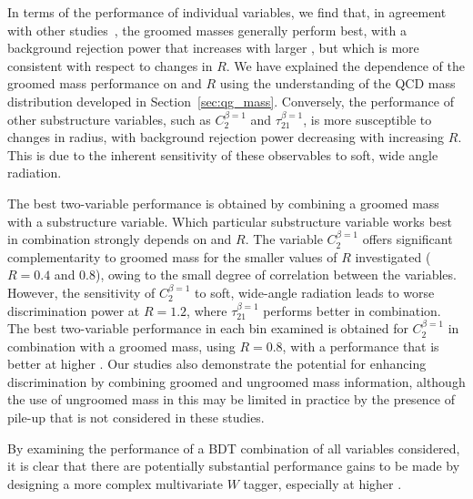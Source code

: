 In terms of the performance of individual variables, we find that, in
agreement with other studies~\cite{ATL-PHYS-PUB-2014-004}, the groomed masses generally perform best, 
with a background rejection
power that increases with larger \pt, but which is more consistent
with respect to changes in $R$. We have explained the dependence of the
groomed mass performance on \pt and $R$ using the understanding of the QCD mass distribution
developed in Section~\ref{sec:qg_mass}. Conversely, the performance of other
substructure variables, such as $C_2^{\beta=1}$ and
$\tau_{21}^{\beta=1}$, is more susceptible to changes in radius, with
background rejection power decreasing with increasing $R$. This is due
to the inherent sensitivity of these observables to soft, wide angle radiation.

The best two-variable performance is obtained by combining a groomed
mass with a substructure variable. Which particular substructure
variable works best in combination strongly depends on \pT and
$R$. The variable $C_2^{\beta=1}$ offers significant complementarity to groomed mass
for the smaller values of $R$ investigated ($R=0.4$ and 0.8), owing to the small degree of correlation between the
variables. 
However, the sensitivity of $C_2^{\beta=1}$ to soft,
wide-angle radiation leads to worse discrimination power at $R=1.2$,
where $\tau_{21}^{\beta=1}$ performs better in combination. The best
two-variable performance in each \pt bin examined is obtained for
$C_2^{\beta=1}$ in combination with a groomed mass, using $R=0.8$,
with a performance that is better at higher \pt.
Our
studies also demonstrate the potential for enhancing discrimination by
combining groomed and ungroomed mass information, although the use of
ungroomed mass in this may be limited in practice by the presence of
pile-up that is not considered in these studies.

By examining the performance of a BDT combination of all  variables
considered, it is clear that there are potentially substantial performance gains to be made by designing a more
complex multivariate $W$ tagger, especially at higher \pt.
